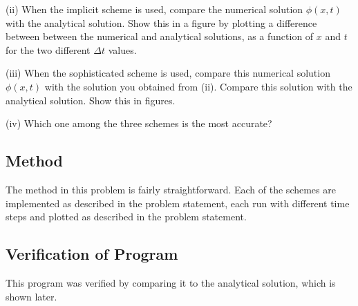 \documentclass[10pt,letter]{article}
\begin{document}
(ii) When the implicit scheme is used, compare the numerical solution $\phi(x, t)$ with the analytical
solution. Show this in a figure by plotting a difference between between the numerical and
analytical solutions, as a function of $x$ and $t$ for the two different $\Delta t$ values.

(iii) When the sophisticated scheme is used, compare this numerical solution $\phi(x, t)$ with the
solution you obtained from (ii). Compare this solution with the analytical solution. Show this
in figures.

(iv) Which one among the three schemes is the most accurate?

\subsection{Method}

The method in this problem is fairly straightforward. Each of the schemes are implemented as described in the problem statement, each run with different time steps and plotted as described in the problem statement.

\subsection{Verification of Program}

This program was verified by comparing it to the analytical solution, which is shown later.

\pagebreak
\end{document}
